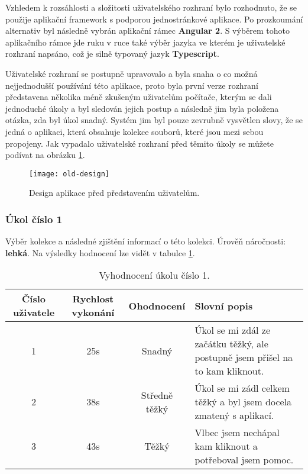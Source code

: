 \par Vzhledem k rozsáhlosti a složitosti uživatelského rozhraní bylo rozhodnuto, že se použije aplikační framework s podporou jednostránkové aplikace. Po prozkoumání alternativ byl následně vybrán aplikační rámec \textbf{Angular 2}. S výběrem tohoto aplikačního rámce jde ruku v ruce také výběr jazyka ve kterém je uživatelské rozhraní napsáno, což je silně typovaný jazyk \textbf{Typescript}.

\par Uživatelské rozhraní se postupně upravovalo a byla snaha o co možná nejjednodušší používání této aplikace, proto byla první verze rozhraní představena několika méně zkušeným uživatelům počítače, kterým se dali jednoduché úkoly a byl sledován jejich postup a následně jim byla položena otázka, zda byl úkol snadný. Systém jim byl pouze zevrubně vysvětlen slovy, že se jedná o aplikaci, která obsahuje kolekce souborů, které jsou mezi sebou propojeny. Jak vypadalo uživatelské rozhraní před těmito úkoly se můžete podívat na obrázku \ref{old-ui}.

\begin{figure}[!h]
\centering
\texttt{[image: old-design]}
\caption{Design aplikace před představením uživatelům.}
\label{old-ui}
\end{figure}

\subsubsection{Úkol číslo 1} Výběr kolekce a následné zjištění informací o této kolekci. Úrověň náročnosti: \textbf{lehká}. Na výsledky hodnocení lze vidět v tabulce \ref{ukol-1}.
\begin{table}[htp]
\begin{center}
\begin{tabular}{ || c || c | c | m{5cm} || }
\hline
Číslo uživatele & Rychlost vykonání & Ohodnocení & Slovní popis \\ [0.5ex]
\hline
\hline
1 & 25s & Snadný & Úkol se mi zdál ze začátku těžký, ale postupně jsem přišel na to kam kliknout. \\
\hline
2 & 38s & Středně těžký & Úkol se mi zádl celkem těžký a byl jsem docela zmatený s aplikací. \\
\hline
3 & 43s & Těžký & Vlbec jsem nechápal kam kliknout a potřeboval jsem pomoc. \\
\hline
\end{tabular}
\end{center}
\caption{Vyhodnocení úkolu číslo 1.}
\label{ukol-1}
\end{table}
